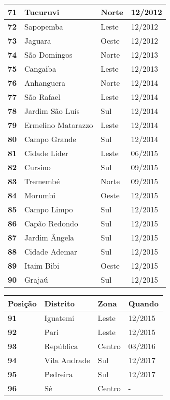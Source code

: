 \begin{table}[H]
\begin{tabular}{l|l|l|l}
		\textbf{71} & Tucuruvi & Norte & 12/2012\\ \hline
		\textbf{72} & Sapopemba & Leste & 12/2012\\ \hline
		\textbf{73} & Jaguara & Oeste & 12/2012\\ \hline
		\textbf{74} & São Domingos & Norte & 12/2013\\ \hline
		\textbf{75} & Cangaiba & Leste & 12/2013\\ \hline
		\textbf{76} & Anhanguera & Norte & 12/2014\\ \hline
		\textbf{77} & São Rafael & Leste & 12/2014\\ \hline
		\textbf{78} & Jardim São Luís & Sul & 12/2014\\ \hline
		\textbf{79} & Ermelino Matarazzo & Leste & 12/2014\\ \hline
		\textbf{80} & Campo Grande & Sul & 12/2014\\ \hline
		\textbf{81} & Cidade Lider & Leste & 06/2015\\ \hline
		\textbf{82} & Cursino & Sul & 09/2015\\ \hline
		\textbf{83} & Tremembé & Norte & 09/2015\\ \hline
		\textbf{84} & Morumbi & Oeste & 12/2015\\ \hline
		\textbf{85} & Campo Limpo & Sul & 12/2015\\ \hline
		\textbf{86} & Capão Redondo & Sul & 12/2015\\ \hline
		\textbf{87} & Jardim Ângela & Sul & 12/2015\\ \hline
		\textbf{88} & Cidade Ademar & Sul & 12/2015\\ \hline
		\textbf{89} & Itaim Bibi & Oeste & 12/2015\\ \hline
		\textbf{90} & Grajaú & Sul & 12/2015\\ 
	\end{tabular}
\end{table}


\begin{table}[H]
	\centering
	\begin{tabular}{l|l|l|l}
		\textbf{Posição} & \textbf{Distrito} & \textbf{Zona} & \textbf{Quando} \\ \hline
		\textbf{91} & Iguatemi & Leste & 12/2015\\ \hline
		\textbf{92} & Pari & Leste & 12/2015\\ \hline
		\textbf{93} & República & Centro & 03/2016\\ \hline
		\textbf{94} & Vila Andrade & Sul & 12/2017\\ \hline
		\textbf{95} & Pedreira & Sul & 12/2017\\ \hline
		\textbf{96} & Sé & Centro & -\\ 
	\end{tabular}
\end{table}

